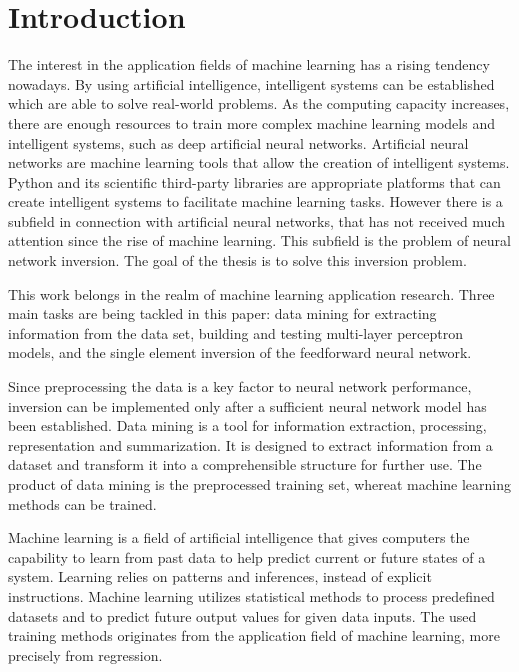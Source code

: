 \chapter{Introduction}

The interest in the application fields of machine learning has a rising tendency nowadays. By using artificial intelligence, intelligent systems can be established which are able to solve real-world problems. As the computing capacity increases, there are enough resources to train more complex machine learning models and intelligent systems, such as deep artificial neural networks. Artificial neural networks are machine learning tools that allow the creation of intelligent systems. Python and its scientific third-party libraries are appropriate platforms that can create intelligent systems to facilitate machine learning tasks. However there is a subfield in connection with artificial neural networks, that has not received much attention since the rise of machine learning. This subfield is the problem of neural network inversion. The goal of the thesis is to solve this inversion problem. \medskip

This work belongs in the realm of machine learning application research. Three main tasks are being tackled in this paper: data mining for extracting information from the data set, building and testing multi-layer perceptron models, and the single element  inversion of the feedforward neural network.\medskip

Since preprocessing the data is a key factor to neural network performance, inversion can be implemented only after a sufficient neural network model has been established. Data mining is a tool for information extraction, processing, representation and summarization. It is designed to extract information from a dataset and transform it into a comprehensible structure for further use. The product of data mining is the preprocessed training set, whereat machine learning methods can be trained. \medskip

Machine learning is a field of artificial intelligence that gives computers the capability to learn from past data to help predict current or future states of a system. Learning relies on patterns and inferences, instead of explicit instructions. Machine learning utilizes statistical methods to process predefined datasets and to predict future output values for given data inputs. The used training methods originates from the application field of machine learning, more precisely from regression. \smallskip

